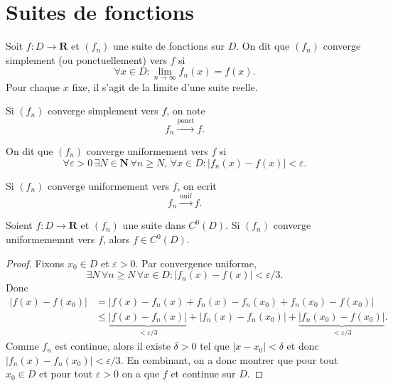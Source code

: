 \chapter{Suites de fonctions}
\begin{definition}
Soit $f:D\to \mathbf{R}$ et $(f_{n})$ une suite de fonctions sur $D$. On dit que $(f_{n})$ converge simplement (ou ponctuellement) vers $f$ si 
$$
\forall x \in D:\lim_{ n \to \infty } f_{n}(x)=f(x).
$$
Pour chaque $x$ fixe, il s'agit de la limite d'une suite reelle.
\end{definition}
\begin{notation}
Si $(f_{n})$ converge simplement vers $f$, on note
$$
f_{n}\overset{\mathrm{ponct}}\longrightarrow f.
$$
\end{notation}
\begin{definition}
On dit que $(f_{n})$ converge uniformement vers $f$ si
$$
\forall\varepsilon>0\,\exists N\in \mathbf{N}\,\forall n\ge N,\,\forall x \in D:|f_{n}(x)-f(x)|<\varepsilon.
$$
\end{definition}
\begin{notation}
Si $(f_{n})$ converge uniformement vers $f$, on ecrit
$$
f_{n}\overset{\mathrm{unif}}\to f.
$$
\end{notation}
\begin{theorem}
Soient $f:D\to \mathbf{R}$ et $(f_{n})$ une suite dans $C^{0}(D)$. Si $(f_{n})$ converge uniformememnt vers $f$, alors $f\in C^{0}(D)$.
\end{theorem}
\begin{proof}
Fixons $x_{0}\in D$ et $\varepsilon>0$. Par convergence uniforme,
$$
\exists N\,\forall n\ge N\,\forall x \in D:|f_{n}(x)-f(x)|<\varepsilon /3.
$$
Donc
\begin{align*}
|f(x)-f(x_{0})| & =|f(x)-f_{n}(x)+f_{n}(x)-f_{n}(x_{0})+f_{n}(x_{0})-f(x_{0})| \\
 & \le \underbrace{ |f(x)-f_{n}(x)| }_{ <\varepsilon /3 }+|f_{n}(x)-f_{n}(x_{0})|+\underbrace{ |f_{n}(x_{0})-f(x_{0})| }_{ <\varepsilon /3 }.
\end{align*}
Comme $f_{n}$ est continue, alors il existe $\delta>0$ tel que $|x-x_{0}|<\delta$ et donc $|f_{n}(x)-f_{n}(x_{0})|<\varepsilon /3$.
En combinant, on a donc montrer que pour tout $x_{0}\in D$ et pour tout $\varepsilon>0$ on a que $f$ et continue sur $D$.
\end{proof}